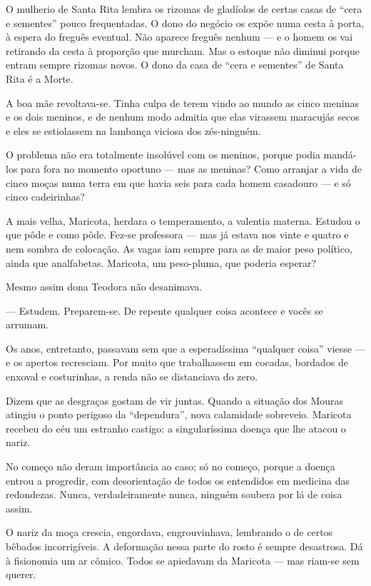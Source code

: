 O mulherio de Santa Rita lembra os rizomas de gladíolos de certas casas
de ``cera e sementes'' pouco frequentadas. O dono do negócio os expõe
numa cesta à porta, à espera do freguês eventual. Não aparece freguês
nenhum --- e o homem os vai retirando da cesta à proporção que murcham.
Mas o estoque não diminui porque entram sempre rizomas novos. O dono da
casa de ``cera e sementes'' de Santa Rita é a Morte.

A boa mãe revoltava-se. Tinha culpa de terem vindo ao mundo as cinco
meninas e os dois meninos, e de nenhum modo admitia que elas virassem
maracujás secos e eles se estiolassem na lambança viciosa dos
zés-ninguém.

O problema não era totalmente insolúvel com os meninos, porque podia
mandá-los para fora no momento oportuno --- mas as meninas? Como
arranjar a vida de cinco moças numa terra em que havia seis para cada
homem casadouro --- e só cinco cadeirinhas?

A mais velha, Maricota, herdara o temperamento, a valentia materna.
Estudou o que pôde e como pôde. Fez-se professora --- mas já estava nos
vinte e quatro e nem sombra de colocação. As vagas iam sempre para as de
maior peso político, ainda que analfabetas. Maricota, um peso-pluma, que
poderia esperar?

Mesmo assim dona Teodora não desanimava.

--- Estudem. Preparem-se. De repente qualquer coisa acontece e vocês se
arrumam.

Os anos, entretanto, passavam sem que a esperadíssima ``qualquer coisa''
viesse --- e os apertos recresciam. Por muito que trabalhassem em
cocadas, bordados de enxoval e costurinhas, a renda não se distanciava
do zero.

Dizem que as desgraças gostam de vir juntas. Quando a situação dos
Mouras atingiu o ponto perigoso da ``dependura'', nova calamidade
sobreveio. Maricota recebeu do céu um estranho castigo: a singularíssima
doença que lhe atacou o nariz.

No começo não deram importância ao caso; só no começo, porque a doença
entrou a progredir, com desorientação de todos os entendidos em medicina
das redondezas. Nunca, verdadeiramente nunca, ninguém soubera por lá de
coisa assim.

O nariz da moça crescia, engordava, engrouvinhava, lembrando o de certos
bêbados incorrigíveis. A deformação nessa parte do rosto é sempre
desastrosa. Dá à fisionomia um ar cômico. Todos se apiedavam da Maricota
--- mas riam-se sem querer.

